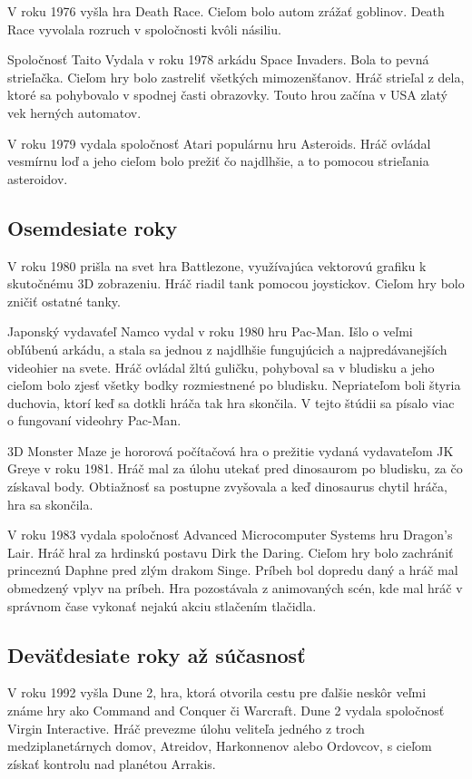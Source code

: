 \documentclass[10pt,oneside,slovak,a4paper]{article}
\begin{document}
V roku 1976 vyšla hra Death Race. Cieľom bolo autom zrážať goblinov. Death Race vyvolala rozruch v spoločnosti kvôli násiliu.

Spoločnosť Taito Vydala v roku 1978 arkádu Space Invaders. Bola to pevná strieľačka. Cieľom hry bolo zastreliť všetkých mimozenšťanov. Hráč strieľal z dela, ktoré sa pohybovalo v spodnej časti obrazovky. Touto hrou začína v USA zlatý vek herných automatov.

V roku 1979 vydala spoločnosť Atari populárnu hru Asteroids. Hráč ovládal vesmírnu loď a jeho cieľom bolo prežiť čo najdlhšie, a to pomocou strieľania asteroidov.

\pagebreak

\subsection{Osemdesiate roky} \label{osemdesiate}
V roku 1980 prišla na svet hra Battlezone, využívajúca vektorovú grafiku k skutočnému 3D zobrazeniu. Hráč riadil tank pomocou joystickov. Cieľom hry bolo zničiť ostatné tanky.

Japonský vydavaťeľ Namco vydal v roku 1980 hru Pac-Man. Išlo o veľmi obľúbenú arkádu, a stala sa jednou z najdlhšie fungujúcich a najpredávanejších videohier na svete. Hráč ovládal žltú guličku, pohyboval sa v bludisku a jeho cieľom bolo zjesť všetky bodky rozmiestnené po bludisku. Nepriateľom boli štyria duchovia, ktorí keď sa dotkli hráča tak hra skončila. V tejto štúdii sa písalo viac o fungovaní videohry Pac-Man\cite{SRVSS20}.

3D Monster Maze je hororová počítačová hra o prežitie vydaná vydavateľom JK Greye v roku 1981. Hráč mal za úlohu utekať pred dinosaurom po bludisku, za čo získaval body. Obtiažnosť sa postupne zvyšovala a keď dinosaurus chytil hráča, hra sa skončila.

V roku 1983 vydala spoločnosť Advanced Microcomputer Systems hru Dragon's Lair. Hráč hral za hrdinskú postavu Dirk the Daring. Cieľom hry bolo zachrániť princeznú Daphne pred zlým drakom Singe. Príbeh bol dopredu daný a hráč mal obmedzený vplyv na príbeh. Hra pozostávala z animovaných scén, kde mal hráč v správnom čase vykonať nejakú akciu stlačením tlačidla.

\subsection{Deväťdesiate roky až súčasnosť} \label{devatdesiate}
V roku 1992 vyšla Dune 2, hra, ktorá otvorila cestu pre ďalšie neskôr veľmi známe hry ako Command and Conquer či Warcraft. Dune 2 vydala spoločnosť Virgin Interactive. Hráč prevezme úlohu veliteľa jedného z troch medziplanetárnych domov, Atreidov, Harkonnenov alebo Ordovcov, s cieľom získať kontrolu nad planétou Arrakis.
\end{document}
